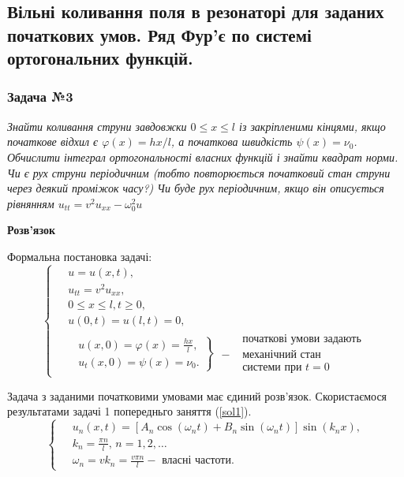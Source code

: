 \documentclass[a4paper, 14pt]{extreport}
\begin{document}
\subsection{Вільні коливання поля в резонаторі для заданих початкових умов. Ряд Фур'є по системі ортогональних функцій.}

\subsubsection{Задача №3}

\textit{Знайти коливання струни завдовжки $0 \leq x \leq l$ із закріпленими кінцями, якщо початкове відхил є $\varphi(x) = hx/l$, а початкова швидкість $\psi(x) = \nu_0$. Обчислити інтеграл ортогональності власних функцій і знайти квадрат норми. Чи є рух струни періодичним (тобто повторюється початковий стан струни через деякий проміжок часу?) Чи буде рух періодичним, якщо він описується рівнянням $u_{tt} = v^2 u_{xx} - \omega_0^2 u$}

\begin{center}
    \textbf{Розв'язок}
\end{center}
Формальна постановка задачі:
\begin{equation} \label{probcond3}
    \left\{ \begin{aligned} %
        &\;u = u(x,t), \\
        &\;u_{tt} = v^2 u_{xx}, \\
        &\;0 \leq x \leq l, t \geq 0, \\
        &\;u(0,t) = u(l,t) = 0,\\
        &\left.\begin{aligned}
            &u(x,0) = \varphi(x) = \frac{hx}{l}, \\ 
            &u_t(x,0) = \psi(x) = \nu_0.
        \end{aligned}\right\} \; 
        \begin{aligned}
            &\text{ початкові умови задають} \\
          - &\text{ механічний стан} \\
            &\text{ системи при } t = 0
        \end{aligned}
    \end{aligned} \right.
\end{equation}

Задача з заданими початковими умовами має єдиний розв'язок. Скористаємося результатами задачі 1 попередньго заняття (\ref{sol1}).
\begin{equation*}
    \left\{ \begin{aligned} \label{fullsol}
        \;&u_n(x,t) = \left[A_n\cos(\omega_n t) + B_n\sin(\omega_n t)\right] \sin(k_n x), \\
        &k_n = \frac{\pi n}{l}, \, n = 1, 2,\ldots\\
        &\omega_n = vk_n = \frac{v \pi n}{l} - \text{ власні частоти}.
    \end{aligned}\right.
\end{equation*}
\end{document}
